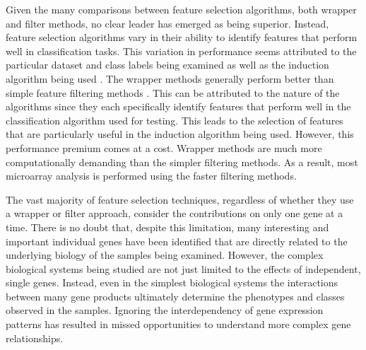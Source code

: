 Given the many comparisons between feature selection algorithms, both wrapper
and filter methods, no clear leader has emerged as being superior.  Instead,
feature selection algorithms vary in their ability to identify features that
perform well in classification tasks.  This variation in performance seems
attributed to the particular dataset and class labels being examined as well as
the induction algorithm being used \cite{guyon2002gsc,PMID_15087314}.  The
wrapper methods generally perform better than simple feature filtering methods
\cite{Ng_1998,Berrar_2003}.  This can be attributed to the nature of the
algorithms since they each specifically identify features that perform well in
the classification algorithm used for testing.  This leads to the selection of
features that are particularly useful in the induction algorithm being used.
However, this performance premium comes at a cost.  Wrapper methods are much
more computationally demanding than the simpler filtering methods.  As a
result, most microarray analysis is performed using the faster filtering
methods.  

The vast majority of feature selection techniques, regardless of whether they
use a wrapper or filter approach, consider the contributions on only one gene
at a time. There is no doubt that, despite this limitation, many interesting
and important individual genes have been identified that are directly related
to the underlying biology of the samples being examined.  However, the complex
biological systems being studied are not just limited to the effects of
independent, single genes.  Instead, even in the simplest biological systems
the interactions between many gene products ultimately determine the phenotypes
and classes observed in the samples.  Ignoring the interdependency of gene
expression patterns has resulted in missed opportunities to understand more
complex gene relationships.

